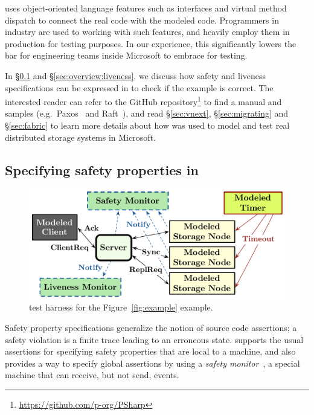 \psharp uses object-oriented language features such as interfaces and virtual method dispatch to connect the real code with the modeled code. Programmers in industry are used to working with such features, and heavily employ them in production for testing purposes. In our experience, this significantly lowers the bar for engineering teams inside Microsoft to embrace \psharp for testing.

In \S\ref{sec:overview:safety} and \S\ref{sec:overview:liveness}, we discuss how safety and liveness specifications can be expressed in \psharp to check if the example is correct. The interested reader can refer to the \psharp GitHub repository\footnote{\url{https://github.com/p-org/PSharp}} to find a manual and samples (e.g.\ Paxos~\cite{lamport1998part} and Raft~\cite{ongaro2014raft}), and read \S\ref{sec:vnext}, \S\ref{sec:migrating} and \S\ref{sec:fabric} to learn more details about how \psharp was used to model and test real distributed storage systems in Microsoft.

\vspace{-1mm}
\subsection{Specifying safety properties in \psharp}
\label{sec:overview:safety}

\begin{figure}[t]
\centering
\includegraphics[width=\linewidth]{img/example}
\vspace{-5mm}
\caption{\psharp test harness for the Figure~\ref{fig:example} example.}
\label{fig:example:model}
\vspace{-2mm}
\end{figure}

Safety property specifications generalize the notion of source code assertions; a safety violation is a finite trace leading to an erroneous state. \psharp supports the usual assertions for specifying safety properties that are local to a \psharp machine, and also provides a way to specify global assertions by using a \emph{safety monitor}~\cite{desai2015building}, a special \psharp machine that can receive, but not send, events.

